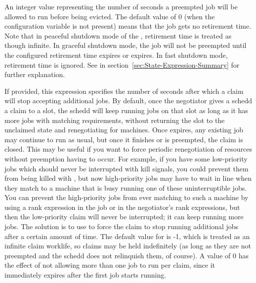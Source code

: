 \begin{description}
\label{param:MaxJobRetirementTime}
\item[\Macro{MAXJOBRETIREMENTTIME}]
  An integer value representing the number of seconds a preempted job
  will be allowed to run before being evicted. The default value of 0
  (when the configuration variable is not present) means that the job
  gets no retirement time.  Note that in peaceful shutdown mode of the
  , retirement time is treated as though infinite.
  In graceful shutdown mode, the job will not be preempted until the
  configured retirement time expires or 
  expires.  In fast shutdown mode, retirement time is ignored.  See
   in
  section~\ref{sec:State-Expression-Summary} for further explanation.

\label{param:ClaimWorklife}
\item[\Macro{CLAIM\_WORKLIFE}]
  If provided, this expression specifies the number of seconds after
  which a claim will stop accepting additional jobs.  By default, once
  the negotiator gives a schedd a claim to a slot, the schedd will
  keep running jobs on that slot as long as it has more jobs with
  matching requirements, without returning the slot to the unclaimed
  state and renegotiating for machines.  Once 
  expires, any existing job may continue to run as usual, but once it
  finishes or is preempted, the claim is closed.
  This may be useful if you want to force periodic renegotiation of
  resources without preemption having to occur.  For example, if you
  have some low-priority jobs which should never be interrupted with
  kill signals, you could prevent them from being killed with
  , but now high-priority jobs may have to
  wait in line when they match to a machine that is busy running one of
  these uninterruptible jobs.  You can prevent the high-priority jobs
  from ever matching to such a machine by using a rank expression in the
  job or in the negotiator's rank expressions, but then the low-priority
  claim will never be interrupted; it can keep running more jobs.  The
  solution is to use  to force the claim to stop
  running additional jobs after a certain amount of time.
  The default value for  is -1, which is treated
  as an infinite claim worklife, so claims may be held indefinitely
  (as long as they are not preempted and the schedd does not
  relinquish them, of course).  A value of 0 has the effect of not allowing
  more than one job to run per claim, since it immediately expires after the
  first job starts running.


\end{description}
